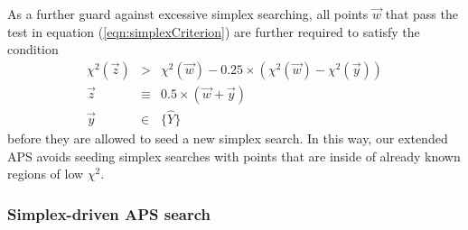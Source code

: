 \documentclass[useAMS,usenatbib]{aastex}
\begin{document}
As a further guard against excessive simplex searching, all points $\vec{w}$ 
that pass the test in equation (\ref{eqn:simplexCriterion}) are further required
to satisfy the condition
\begin{eqnarray}
\chi^2(\vec{z})&>&\chi^2(\vec{w})-0.25\times\left(\chi^2(\vec{w})-\chi^2(\vec{y})\right)\\
\vec{z}&\equiv&0.5\times\left(\vec{w}+\vec{y}\right)\\
\vec{y}&\in&\{\hat{Y}\}
\end{eqnarray}
before they are allowed to seed a new simplex search.  In this way, our 
extended APS avoids seeding simplex
searches with points that are inside of already known regions of low $\chi^2$.

\subsubsection{Simplex-driven APS search}
\label{sec:simplex_strad}
\end{document}
